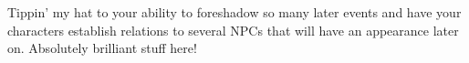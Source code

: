 Tippin' my hat to your ability to foreshadow so many later events and have your characters establish relations to several NPCs that will have an appearance later on. Absolutely brilliant stuff here!\\

